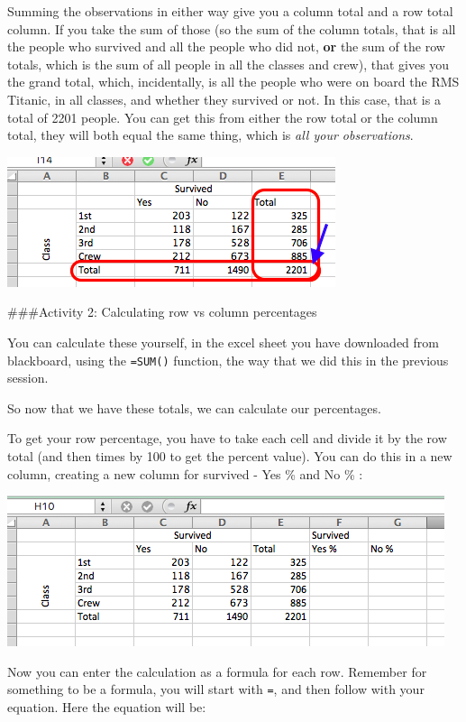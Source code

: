 \documentclass[]{book}
\theoremstyle{definition}
\theoremstyle{definition}
\theoremstyle{definition}
\theoremstyle{remark}
\begin{document}
Summing the observations in either way give you a column total and a row
total column. If you take the sum of those (so the sum of the column
totals, that is all the people who survived and all the people who did
not, \textbf{or} the sum of the row totals, which is the sum of all
people in all the classes and crew), that gives you the grand total,
which, incidentally, is all the people who were on board the RMS
Titanic, in all classes, and whether they survived or not. In this case,
that is a total of 2201 people. You can get this from either the row
total or the column total, they will both equal the same thing, which is
\emph{all your observations}.

\includegraphics{imgs/titanic_w_total_cols.png}

\#\#\#Activity 2: Calculating row vs column percentages

 You can calculate these yourself, in the excel sheet you have
downloaded from blackboard, using the \texttt{=SUM()} function, the way
that we did this in the previous session.

So now that we have these totals, we can calculate our percentages.

To get your row percentage, you have to take each cell and divide it by
the row total (and then times by 100 to get the percent value). You can
do this in a new column, creating a new column for survived - Yes \% and
No \% :

\includegraphics{imgs/surv_perc_cols.png}

Now you can enter the calculation as a formula for each row. Remember
for something to be a formula, you will start with \texttt{=}, and then
follow with your equation. Here the equation will be:
\end{document}
